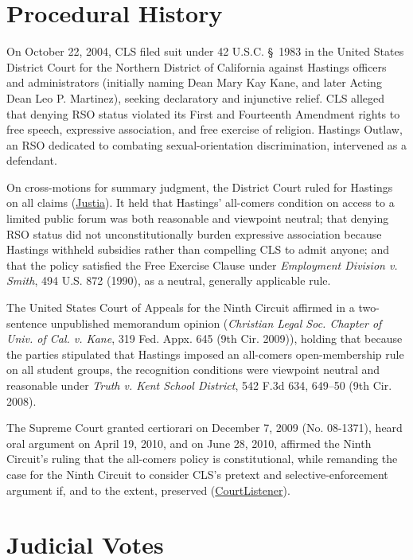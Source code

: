 \documentclass[12pt]{article}
\begin{document}
\section{Procedural History}

On October 22, 2004, CLS filed suit under 42 U.S.C. \S~1983 in the United States District Court for the Northern District of California against Hastings officers and administrators (initially naming Dean Mary Kay Kane, and later Acting Dean Leo P. Martinez), seeking declaratory and injunctive relief. CLS alleged that denying RSO status violated its First and Fourteenth Amendment rights to free speech, expressive association, and free exercise of religion. Hastings Outlaw, an RSO dedicated to combating sexual-orientation discrimination, intervened as a defendant.

On cross-motions for summary judgment, the District Court ruled for Hastings on all claims (\href{https://supreme.justia.com/cases/federal/us/561/661/}{Justia}). It held that Hastings' all-comers condition on access to a limited public forum was both reasonable and viewpoint neutral; that denying RSO status did not unconstitutionally burden expressive association because Hastings withheld subsidies rather than compelling CLS to admit anyone; and that the policy satisfied the Free Exercise Clause under \textit{Employment Division v. Smith}, 494 U.S. 872 (1990), as a neutral, generally applicable rule.

The United States Court of Appeals for the Ninth Circuit affirmed in a two-sentence unpublished memorandum opinion (\textit{Christian Legal Soc. Chapter of Univ. of Cal. v. Kane}, 319 Fed. Appx. 645 (9th Cir. 2009)), holding that because the parties stipulated that Hastings imposed an all-comers open-membership rule on all student groups, the recognition conditions were viewpoint neutral and reasonable under \textit{Truth v. Kent School District}, 542 F.3d 634, 649--50 (9th Cir. 2008).

The Supreme Court granted certiorari on December 7, 2009 (No. 08-1371), heard oral argument on April 19, 2010, and on June 28, 2010, affirmed the Ninth Circuit's ruling that the all-comers policy is constitutional, while remanding the case for the Ninth Circuit to consider CLS's pretext and selective-enforcement argument if, and to the extent, preserved (\href{https://www.courtlistener.com/opinion/150544/christian-legal-soc-chapter-of-univ-of-cal-hastings-college-of-law-v/}{CourtListener}).

\section{Judicial Votes}
\end{document}
